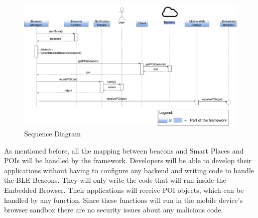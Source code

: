 \begin{figure}[!ht]
  \centering
    \includegraphics[width=1\textwidth]{img/smart-places-poi-sequence}
    \caption{Sequence Diagram}
    \label{fig:sequence-poi}
\end{figure}

As mentioned before, all the mapping between
beacons and Smart Places and POIs will be handled
by the framework. Developers will be able
to develop their applications without having to
configure any backend and writing code to handle
the BLE Beacons.
They will only write the code
that will run inside the Embedded Browser.
Their applications will receive POI objects,
which can be handled by any function. Since
these functions will run in the mobile
device's browser sandbox there are no security
issues about any malicious code.

